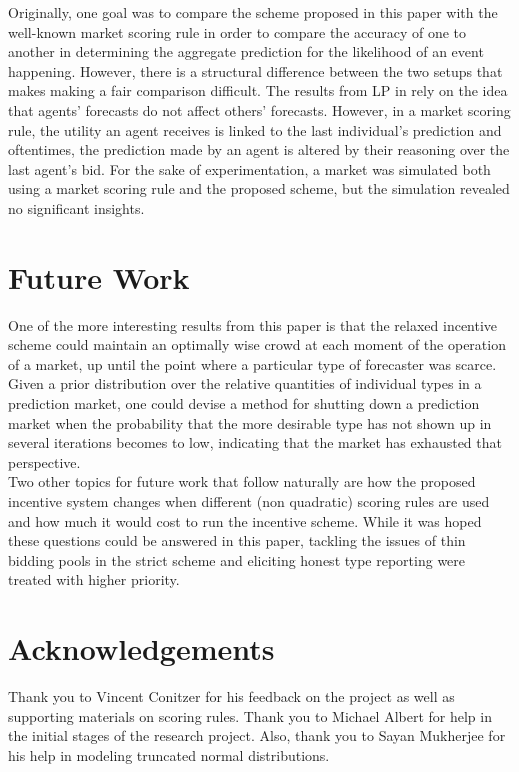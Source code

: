 \documentclass[twoside,twocolumn]{article}
\begin{document}
Originally, one goal was to compare the scheme proposed in this paper with the well-known market scoring rule \cite{5} in order to compare the accuracy of one to another in determining the aggregate prediction for the likelihood of an event happening. However, there is a structural difference between the two setups that makes making a fair comparison difficult. The results from LP in \cite{3} rely on the idea that agents' forecasts do not affect others' forecasts. However, in a market scoring rule, the utility an agent receives is linked to the last individual's prediction and oftentimes, the prediction made by an agent is altered by their reasoning over the last agent's bid. For the sake of experimentation, a market was simulated both using a market scoring rule and the proposed scheme, but the simulation revealed no significant insights.

\section{Future Work}

One of the more interesting results from this paper is that the relaxed incentive scheme could maintain an optimally wise crowd at each moment of the operation of a market, up until the point where a particular type of forecaster was scarce. Given a prior distribution over the relative quantities of individual types in a prediction market, one could devise a method for shutting down a prediction market when the probability that the more desirable type has not shown up in several iterations becomes to low, indicating that the market has exhausted that perspective.\\

Two other topics for future work that follow naturally are how the proposed incentive system changes when different (non quadratic) scoring rules are used and how much it would cost to run the incentive scheme. While it was hoped these questions could be answered in this paper, tackling the issues of thin bidding pools in the strict scheme and eliciting honest type reporting were treated with higher priority.

\section{Acknowledgements}

Thank you to Vincent Conitzer for his feedback on the project as well as supporting materials on scoring rules. Thank you to Michael Albert for help in the initial stages of the research project. Also, thank you to Sayan Mukherjee for his help in modeling truncated normal distributions.
\end{document}

